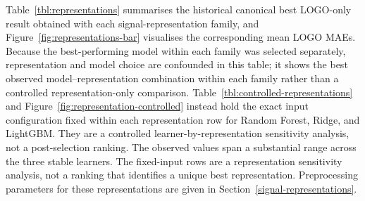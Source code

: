 Table~\ref{tbl:representations} summarises the historical canonical best LOGO-only result
obtained with each signal-representation family, and
Figure~\ref{fig:representations-bar} visualises the corresponding mean
LOGO MAEs. Because the best-performing model within each family was
selected separately, representation and model choice are confounded in
this table; it shows the best observed model--representation combination
within each family rather than a controlled representation-only
comparison. Table~\ref{tbl:controlled-representations} and
Figure~\ref{fig:representation-controlled} instead hold the exact
input configuration fixed within each representation row for Random
Forest, Ridge, and LightGBM. They are a controlled
learner-by-representation sensitivity analysis, not a post-selection
ranking. The observed values span a substantial
range across the three stable learners. The fixed-input rows are a
representation sensitivity analysis, not a ranking that identifies a
unique best representation. Preprocessing parameters for these
representations are given in Section~\ref{signal-representations}.

